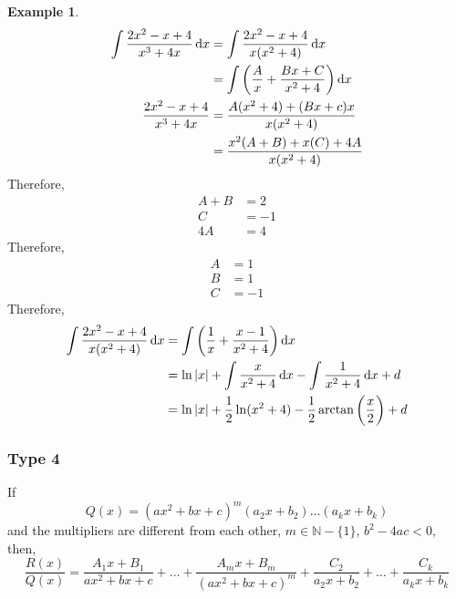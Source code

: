 \documentclass[fleqn]{article}
\theoremstyle{definition}
\newtheorem{example}{Example}
\theoremstyle{theorem}
\theoremstyle{remark}
\begin{document}
\begin{example}
	\begin{align*}
		\int \dfrac{2x^2 - x + 4}{x^3 + 4x} \dif x &= \int \dfrac{2x^2 - x + 4}{x(x^2 + 4)} \dif x\\
		&= \int \left(\dfrac{A}{x} + \dfrac{Bx + C}{x^2 + 4}\right) \dif x\\
		\dfrac{2x^2 - x + 4}{x^3 + 4x} &= \dfrac{A(x^2 + 4) + (Bx + c)x}{x(x^2 + 4)}\\
		&= \dfrac{x^2(A + B) + x(C) + 4A}{x(x^2 + 4)}
	\end{align*}
	Therefore,
	\begin{align*}
		A + B &= 2\\
		C &= -1\\
		4A &= 4
	\end{align*}
	Therefore, 
	\begin{align*}
		A &= 1\\
		B &= 1\\
		C &= -1
	\end{align*}
	Therefore,
	\begin{align*}
		\int \dfrac{2x^2 - x + 4}{x(x^2 + 4)} \dif x &= \int \left(\dfrac{1}{x} + \dfrac{x - 1}{x^2 + 4}\right) \dif x\\
		&= \ln |x| + \int \dfrac{x}{x^2 + 4} \dif x - \int \dfrac{1}{x^2 + 4} \dif x + d\\
		&= \ln |x| + \dfrac{1}{2} \ln (x^2 + 4) - \dfrac{1}{2}\arctan\left(\dfrac{x}{2}\right) + d
	\end{align*}
\end{example}

\subsubsection{Type 4}

If 
\begin{equation*}
Q(x) = (ax^2 + bx + c)^m (a_2 x + b_2) \dots (a_k x + b_k)
\end{equation*}
and the multipliers are different from each other, $m \in \mathbb{N} - \{1\}$, $b^2 - 4ac < 0$, then,
\begin{equation*}
\dfrac{R(x)}{Q(x)} = \dfrac{A_1 x + B_1}{ax^2 + bx + c} + \dots + \dfrac{A_m x + B_m}{(ax^2 + bx + c)^m} + \dfrac{C_2}{a_2 x + b_2} + \dots + \dfrac{C_k}{a_k x + b_k}
\end{equation*}
\end{document}
